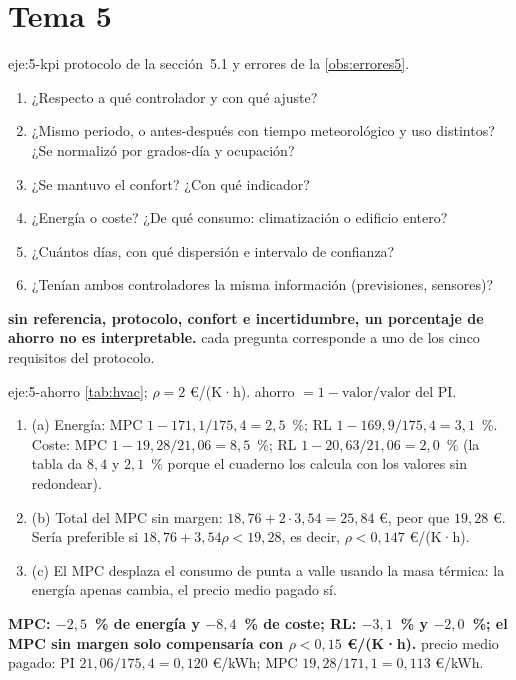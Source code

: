 \section{Tema 5}

\begin{solucion}{eje:5-kpi}
\planteamiento protocolo de la sección~5.1 y errores de la \cref{obs:errores5}.
\pasos
\begin{enumerate}[label=\arabic*.]
  \item ¿Respecto a qué controlador y con qué ajuste?
  \item ¿Mismo periodo, o antes-después con tiempo meteorológico y uso distintos? ¿Se normalizó por grados-día y ocupación?
  \item ¿Se mantuvo el confort? ¿Con qué indicador?
  \item ¿Energía o coste? ¿De qué consumo: climatización o edificio entero?
  \item ¿Cuántos días, con qué dispersión e intervalo de confianza?
  \item ¿Tenían ambos controladores la misma información (previsiones, sensores)?
\end{enumerate}
\resultado \textbf{sin referencia, protocolo, confort e incertidumbre, un porcentaje de ahorro no es interpretable.}
\comprobacion cada pregunta corresponde a uno de los cinco requisitos del protocolo.
\end{solucion}

\begin{solucion}{eje:5-ahorro}
\datos \cref{tab:hvac}; $\rho=2$ €/(K·h).
\planteamiento ahorro $=1-\text{valor}/\text{valor del PI}$.
\pasos
\begin{enumerate}[label=\arabic*.]
  \item (a) Energía: MPC $1-171{,}1/175{,}4=2{,}5$~\%; RL $1-169{,}9/175{,}4=3{,}1$~\%. Coste: MPC $1-19{,}28/21{,}06=8{,}5$~\%; RL $1-20{,}63/21{,}06=2{,}0$~\% (la tabla da $8{,}4$ y $2{,}1$~\% porque el cuaderno los calcula con los valores sin redondear).
  \item (b) Total del MPC sin margen: $18{,}76+2\cdot3{,}54=25{,}84$ €, peor que $19{,}28$ €. Sería preferible si $18{,}76+3{,}54\rho<19{,}28$, es decir, $\rho<0{,}147$ €/(K·h).
  \item (c) El MPC desplaza el consumo de punta a valle usando la masa térmica: la energía apenas cambia, el precio medio pagado sí.
\end{enumerate}
\resultado \textbf{MPC: $-2{,}5$~\% de energía y $-8{,}4$~\% de coste; RL: $-3{,}1$~\% y $-2{,}0$~\%; el MPC sin margen solo compensaría con $\rho<0{,}15$ €/(K·h).}
\comprobacion precio medio pagado: PI $21{,}06/175{,}4=0{,}120$ €/kWh; MPC $19{,}28/171{,}1=0{,}113$ €/kWh.
\end{solucion}

